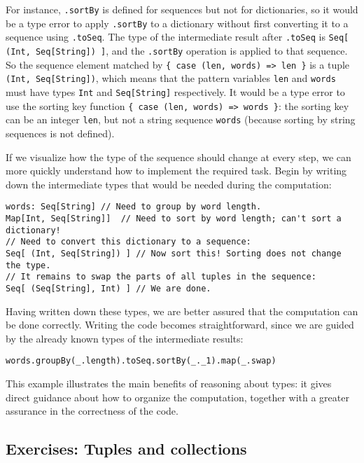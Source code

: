 For instance, \lstinline!.sortBy! is defined for sequences but not
for dictionaries, so it would be a type error to
apply \lstinline!.sortBy! to a dictionary without first converting
it to a sequence using \lstinline!.toSeq!. The type of the intermediate
result after \lstinline!.toSeq! is \lstinline!Seq[ (Int, Seq[String]) ]!,
and the \lstinline!.sortBy! operation is applied to that sequence.
So the sequence element matched by \lstinline!{ case (len, words) => len }!
is a tuple \lstinline!(Int, Seq[String])!, which means that the pattern
variables \lstinline!len! and \lstinline!words! must have types
\lstinline!Int! and \lstinline!Seq[String]! respectively. It would
be a type error to use the sorting key function \lstinline!{ case (len, words) => words }!:
the sorting key can be an integer \lstinline!len!, but not a string
sequence \lstinline!words! (because sorting by string sequences is
not defined).

If we visualize how the type of the sequence should change at every
step, we can more quickly understand how to implement the required
task. Begin by writing down the intermediate types that would be needed
during the computation:
\begin{lstlisting}
words: Seq[String] // Need to group by word length.
Map[Int, Seq[String]]  // Need to sort by word length; can't sort a dictionary!
// Need to convert this dictionary to a sequence:
Seq[ (Int, Seq[String]) ] // Now sort this! Sorting does not change the type.
// It remains to swap the parts of all tuples in the sequence:
Seq[ (Seq[String], Int) ] // We are done.
\end{lstlisting}
Having written down these types, we are better assured that the computation
can be done correctly. Writing the code becomes straightforward, since
we are guided by the already known types of the intermediate results:
\begin{lstlisting}
words.groupBy(_.length).toSeq.sortBy(_._1).map(_.swap)
\end{lstlisting}

This example illustrates the main benefits of reasoning about types:
it gives direct guidance about how to organize the computation, together
with a greater assurance in the correctness of the code.

\subsection{Exercises: Tuples and collections}

